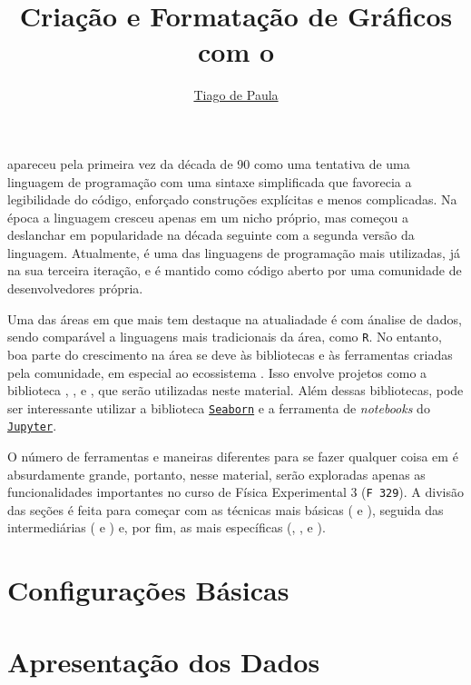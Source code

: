 \documentclass{article}
\title{Criação e Formatação de Gráficos com o}\softwarelogo
\author{\href{mailto:t187679@dac.unicamp.br}{Tiago de Paula}}
\date{}
\begin{document}
    \maketitle

    \software apareceu pela primeira vez da década de 90 como uma tentativa de uma linguagem de programação com uma sintaxe simplificada que favorecia a legibilidade do código, enforçado construções explícitas e menos complicadas. Na época a linguagem cresceu apenas em um nicho próprio, mas começou a deslanchar em popularidade na década seguinte com a segunda versão da linguagem. Atualmente, \software é uma das linguagens de programação mais utilizadas, já na sua terceira iteração, e é mantido como código aberto por uma comunidade de desenvolvedores própria.

    Uma das áreas em que \software mais tem destaque na atualiadade é com ánalise de dados, sendo comparável a linguagens mais tradicionais da área, como \texttt{R}. No entanto, boa parte do crescimento na área se deve às bibliotecas e às ferramentas criadas pela comunidade, em especial ao ecossistema \href{https://scipy.org/index.html}{\scipy}. Isso envolve projetos como a biblioteca \href{https://scipy.org/scipylib/index.html}{\scipy}, \href{http://www.numpy.org/}{\numpy}, \href{https://matplotlib.org/}{\matplotlib} e \href{http://pandas.pydata.org/}{\pandas}, que serão utilizadas neste material. Além dessas bibliotecas, pode ser interessante utilizar a biblioteca \href{https://seaborn.pydata.org/}{\texttt{Seaborn}} e a ferramenta de \textit{notebooks} do \href{https://jupyter.org/}{\texttt{Jupyter}}.

    O número de ferramentas e maneiras diferentes para se fazer qualquer coisa em \software é absurdamente grande, portanto, nesse material, serão exploradas apenas as funcionalidades importantes no curso de Física Experimental 3 (\texttt{F 329}). A divisão das seções é feita para começar com as técnicas mais básicas ( e ), seguida das intermediárias ( e ) e, por fim, as mais específicas (, ,  e ).

    \section{Configurações Básicas} \label{sec:basico}

    \section{Apresentação dos Dados} \label{sec:reta}
\end{document}
